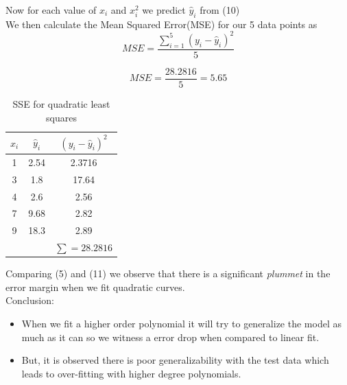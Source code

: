 \documentclass{scrartcl}
\begin{document}
Now for each value of $x_i$ and $x_i^2$ we predict $\hat y_i$ from (10)\\

We then calculate the Mean Squared Error(MSE) for our 5 data points as\\

$$MSE =\frac{\sum_{i=1}^{5}(y_i-\hat y_i)^2}{5}$$

\begin{equation}
MSE =\frac{28.2816}{5}=5.65    
\end{equation}


\begin{table}[ht]
    \centering
    \begin{tabular}{|c|c|c|}
    \hline
        $x_i$ & $\hat y_i$ & $(y_i-\hat y_i)^2$ \\
    \hline \hline
        1 & 2.54 & 2.3716\\
    \hline
        3 & 1.8 & 17.64\\
    \hline
        4 & 2.6 & 2.56\\
    \hline
        7 & 9.68 & 2.82\\
    \hline
        9 & 18.3 & 2.89\\
    \hline
        &  & $\sum=28.2816$\\
    \hline
    \end{tabular}
    \caption{SSE for quadratic least squares}
    \label{tab:SSE2}
\end{table}

Comparing (5) and (11) we observe that there is a significant \emph{plummet} in the error margin when we fit quadratic curves.\\

Conclusion:
\begin{itemize}
    \item When we fit a higher order polynomial it will try to generalize the model as much as it can so we witness a error drop when compared to linear fit.
    \item But, it is observed there is poor generalizability with the test data which leads to over-fitting with higher degree polynomials. 
\end{itemize}
\end{document}
